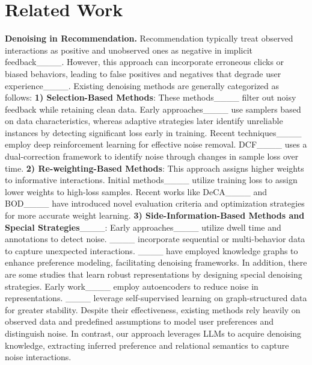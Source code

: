\section{Related Work}
\textbf{Denoising in Recommendation.}
Recommendation typically treat observed interactions as positive and unobserved ones as negative in implicit feedback____. However, this approach can incorporate erroneous clicks or biased behaviors, leading to false positives and negatives that degrade user experience____. Existing denoising methods are generally categorized as follows:
\textbf{1) Selection-Based Methods}: These methods____ filter out noisy feedback while retaining clean data. Early approaches____ use samplers based on data characteristics, whereas adaptive strategies later identify unreliable instances by detecting significant loss early in training. Recent techniques____ employ deep reinforcement learning for effective noise removal. DCF____ uses a dual-correction framework to identify noise through changes in sample loss over time.
\textbf{2) Re-weighting-Based Methods}: This approach assigns higher weights to informative interactions. Initial methods____ utilize training loss to assign lower weights to high-loss samples. Recent works like DeCA____ and BOD____ have introduced novel evaluation criteria and optimization strategies for more accurate weight learning.
\textbf{3) Side-Information-Based Methods and Special Strategies}____: Early approaches____ utilize dwell time and annotations to detect noise. ____ incorporate sequential or multi-behavior data to capture unexpected interactions. ____ have employed knowledge graphs to enhance preference modeling, facilitating denoising frameworks. 
In addition, there are some studies that learn robust representations by designing special denoising strategies. Early work____ employ autoencoders to reduce noise in representations. ____ leverage self-supervised learning on graph-structured data for greater stability. 
Despite their effectiveness, existing methods rely heavily on observed data and predefined assumptions to model user preferences and distinguish noise. In contrast, our approach leverages LLMs to acquire denoising knowledge, extracting inferred preference and relational semantics to capture noise interactions.

\vspace{-2mm}
